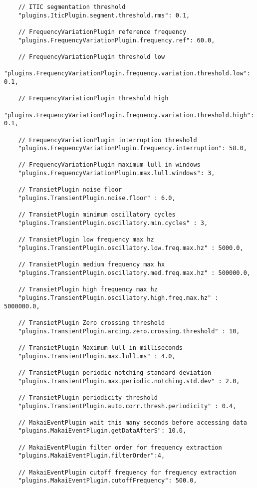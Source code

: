 \begin{verbatim}
	// ITIC segmentation threshold
	"plugins.IticPlugin.segment.threshold.rms": 0.1,
	
	// FrequencyVariationPlugin reference frequency
	"plugins.FrequencyVariationPlugin.frequency.ref": 60.0,
	
	// FrequencyVariationPlugin threshold low
	"plugins.FrequencyVariationPlugin.frequency.variation.threshold.low": 0.1,
	
	// FrequencyVariationPlugin threshold high
	"plugins.FrequencyVariationPlugin.frequency.variation.threshold.high": 0.1,
	
	// FrequencyVariationPlugin interruption threshold
	"plugins.FrequencyVariationPlugin.frequency.interruption": 58.0,
	
	// FrequencyVariationPlugin maximum lull in windows
	"plugins.FrequencyVariationPlugin.max.lull.windows": 3,
	
	// TransietPlugin noise floor
	"plugins.TransientPlugin.noise.floor" : 6.0,
	
	// TransietPlugin minimum oscillatory cycles
	"plugins.TransientPlugin.oscillatory.min.cycles" : 3,
	
	// TransietPlugin low frequency max hz
	"plugins.TransientPlugin.oscillatory.low.freq.max.hz" : 5000.0,
	
	// TransietPlugin medium frequency max hx
	"plugins.TransientPlugin.oscillatory.med.freq.max.hz" : 500000.0,
	
	// TransietPlugin high frequency max hz
	"plugins.TransientPlugin.oscillatory.high.freq.max.hz" : 5000000.0,
	
	// TransietPlugin Zero crossing threshold
	"plugins.TransientPlugin.arcing.zero.crossing.threshold" : 10,
	
	// TransietPlugin Maximum lull in milliseconds
	"plugins.TransientPlugin.max.lull.ms" : 4.0,
	
	// TransietPlugin periodic notching standard deviation
	"plugins.TransientPlugin.max.periodic.notching.std.dev" : 2.0,
	
	// TransietPlugin periodicity threshold
	"plugins.TransientPlugin.auto.corr.thresh.periodicity" : 0.4,
	
	// MakaiEventPlugin wait this many seconds before accessing data
	"plugins.MakaiEventPlugin.getDataAfterS": 10.0,
	
	// MakaiEventPlugin filter order for frequency extraction
	"plugins.MakaiEventPlugin.filterOrder":4,
	
	// MakaiEventPlugin cutoff frequency for frequency extraction
	"plugins.MakaiEventPlugin.cutoffFrequency": 500.0,
	

\end{verbatim}

